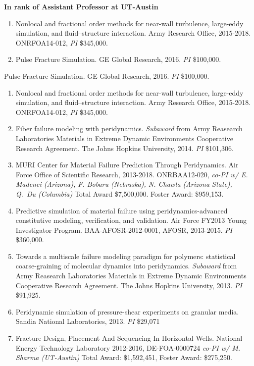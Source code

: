     \pagebreak[2]
    \textbf{In rank of Assistant Professor at UT-Austin}
\begin{enumerate}[resume]
    \item Nonlocal and fractional order methods for near-wall turbulence, large-eddy simulation, and fluid--structure interaction. Army Research Office, 2015-2018. ONRFOA14-012, \textit{PI} {\$}345,000.
    \item Pulse Fracture Simulation. GE Global Research, 2016. \textit{PI} \$100,000.
\end{enumerate}
\else
\ifdefined\ispdf
\begin{etaremune}
    \item Pulse Fracture Simulation. GE Global Research, 2016. \textit{PI} \$100,000.
\else
\begin{enumerate}
\fi
    \item Nonlocal and fractional order methods for near-wall turbulence, large-eddy simulation, and fluid--structure interaction. Army Research Office, 2015-2018. ONRFOA14-012, \textit{PI} {\$}345,000.
  \item Fiber failure modeling with peridynamics. \textit{Subaward} from Army Reasearch Laboratories Materials in Extreme Dynamic Environments Cooperative Research Agreement.  The Johns Hopkins University, 2014. \textit{PI} \$101,306.
  \item MURI Center for Material Failure Prediction Through Peridynamics. Air Force Office of Scientific Research, 2013-2018. ONRBAA12-020, \textit{co-PI w/ E. Madenci (Arizona), F. Bobaru (Nebraska), N. Chawla (Arizona State), Q.\ Du (Columbia)} Total Award {\$}7,500,000.  Foster Award: \$959,153.
  \item Predictive simulation of material failure using peridynamics-advanced constitutive modeling, verification, and validation. Air Force FY2013 Young Investigator Program. BAA-AFOSR-2012-0001, AFOSR, 2013-2015. \textit{PI} \$360,000.
  \item Towards a multiscale failure modeling paradigm for polymers: statistical coarse-graining of molecular dynamics into peridynamics. \textit{Subaward} from Army Reasearch Laboratories Materials in Extreme Dynamic Environments Cooperative Research Agreement.  The Johns Hopkins University, 2013. \textit{PI} \$91,925.
  \item Peridynamic simulation of pressure-shear experiments on granular media.  Sandia National Laboratories, 2013. \textit{PI} \$29,071
  \item Fracture Design, Placement And Sequencing In Horizontal Wells. National Energy Technology Laboratory 2012-2016, DE-FOA-0000724 \textit{co-PI w/ M. Sharma (UT-Austin)} Total Award: {\$1,592,451}, Foster Award: \$275,250.

\end{enumerate}
\end{etaremune}
